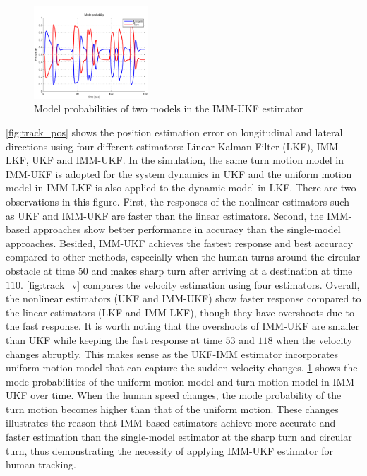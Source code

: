 \documentclass[letterpaper, 10 pt, conference]{ieeeconf}
\newcommand{\todonote}[1]{\vspace{0px} %
\todo[inline, color=green!30]{\textbf{[Note:]} {#1}} %
}
\begin{document}
\begin{figure}
\centering
\includegraphics[width=0.38\textwidth]{figures/mode_prob}
\caption{Model probabilities of two models in the IMM-UKF estimator}
\label{fig:mode_prob}
\end{figure}
\cref{fig:track_pos} shows the position estimation error on longitudinal and lateral directions using four different estimators: Linear Kalman Filter (LKF), IMM-LKF, UKF and IMM-UKF. 
In the simulation, the same turn motion model in IMM-UKF is adopted for the system dynamics in UKF and the uniform motion model in IMM-LKF is also applied to the dynamic model in LKF.  
There are two observations in this figure. First, the responses of the nonlinear estimators such as UKF and IMM-UKF are faster than the linear estimators. Second, the IMM-based approaches show better performance in accuracy than the single-model approaches.
Besided, IMM-UKF achieves the fastest response and best accuracy compared to other methods, especially when the human turns around the circular obstacle at time $50$ and makes sharp turn after arriving at a destination at time $110$. 
\cref{fig:track_v} compares the velocity estimation using four estimators.
Overall, the nonlinear estimators (UKF and IMM-UKF) show faster response compared to the linear estimators (LKF and IMM-LKF), though they have overshoots due to the fast response. 
It is worth noting that the overshoots of IMM-UKF are smaller than UKF while keeping the fast response at time $53$ and $118$ when the velocity changes abruptly.    
This makes sense as the UKF-IMM estimator incorporates uniform motion model that can capture the sudden velocity changes.
\cref{fig:mode_prob} shows the mode probabilities of the uniform motion model and turn motion model in IMM-UKF over time.
When the human speed changes, the mode probability of the turn motion becomes higher than that of the uniform motion. 
These changes illustrates the reason that IMM-based estimators achieve more accurate and faster estimation than the single-model estimator at the sharp turn and circular turn, thus demonstrating the necessity of applying IMM-UKF estimator for human tracking.
\end{document}
